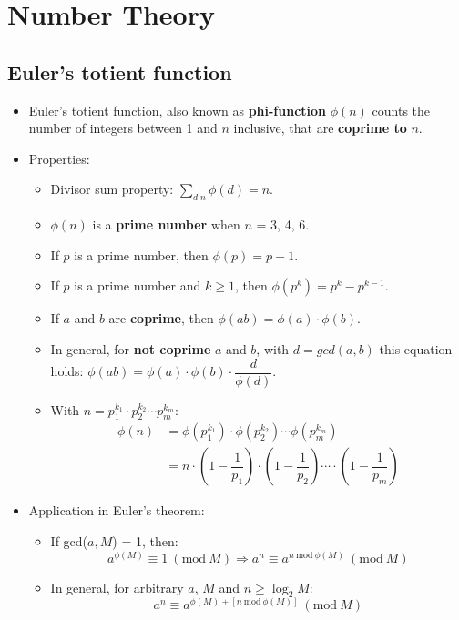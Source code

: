 \section{Number Theory}

\subsection{Euler's totient function}
\begin{itemize}
	\item Euler's totient function, also known as \textbf{phi-function} $\phi(n)$ 
	counts the number of integers between 1 and $n$ inclusive, that are
	\textbf{coprime to} $n$.
	\item Properties:
	\begin{itemize}
		\item Divisor sum property: $\sum\limits_{d | n} \phi(d) = n$.
		\item $\phi(n)$ is a \textbf{prime number} when $n$ = 3, 4, 6.
		\item If $p$ is a prime number, then $\phi(p) = p - 1$.
		\item If $p$ is a prime number and $k \geq 1$, then $\phi(p^k) = p^k - p^{k - 1}$.
		\item If $a$ and $b$ are \textbf{coprime}, then $\phi(ab) = \phi(a) \cdot \phi(b)$.
		\item In general, for \textbf{not coprime} $a$ and $b$, with $d = gcd(a, b)$ this equation holds: 
		$\phi(ab) = \phi(a) \cdot \phi(b) \cdot \dfrac{d}{\phi(d)}$.
		\item With $n = p_1^{k_1} \cdot p_2^{k_2} \cdots p_m^{k_m}$:
		\begin{align*}
			\phi(n) &= \phi(p_1^{k_1}) \cdot \phi(p_2^{k_2}) \cdots \phi(p_m^{k_m}) \\ 
			&= n \cdot \left(1 - \dfrac{1}{p_1}\right) \cdot \left(1 - \dfrac{1}{p_2}\right) \cdots \cdot \left(1 - \dfrac{1}{p_m}\right)
		\end{align*}
	\end{itemize}
	\item Application in Euler's theorem:
	\begin{itemize}
		\item If gcd($a, M$) = 1, then:
		\[ a^{\phi(M)} \equiv 1\ (\text{mod}\ M) \Rightarrow a^{n} \equiv a^{n\ \text{mod}\ \phi(M)}\ (\text{mod}\ M)\]
		\item In general, for arbitrary $a$, $M$ and $n \geq \log_2{M}$:
		\[ a^{n} \equiv a^{\phi(M) + [n\ \text{mod}\ \phi(M)]}\ (\text{mod}\ M)\]
	\end{itemize}
\end{itemize}

